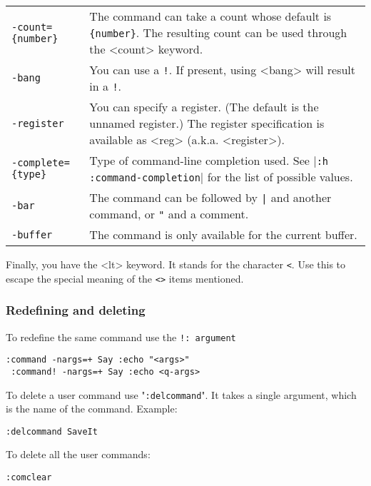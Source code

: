 \begin{center} \begin{tabularx} {\textwidth}{l X} %
				\texttt{-count=\{number\}} & The command can take a count whose default is \texttt{\{number\}}.  The resulting count can be used through the <count> keyword. \\
				\texttt{-bang} & You can use a \texttt{!}.  If present, using <bang> will result in a \texttt{!}. \\
				\texttt{-register} & You can specify a register.  (The default is the unnamed register.) The register specification is available as <reg> (a.k.a. <register>). \\
				\texttt{-complete=\{type\}} & Type of command-line completion used.  See |\texttt{:h :command-completion}| for the list of possible values. \\
				\texttt{-bar} & The command can be followed by \texttt{|} and another command, or \texttt{"} and a comment. \\
				\texttt{-buffer} & The command is only available for the current buffer. \\
\end{tabularx} \end{center}

Finally, you have the <lt> keyword.
It stands for the character \texttt{<}.
Use this to escape the special meaning of the \texttt{<>} items mentioned.

\subsubsection{Redefining and deleting}
To redefine the same command use the \texttt{!: argument}

\begin{Verbatim}[samepage=true]
 :command -nargs=+ Say :echo "<args>"
 :command! -nargs=+ Say :echo <q-args>
\end{Verbatim}

To delete a user command use "\texttt{:delcommand}".
It takes a single argument, which is the name of the command.
Example:

\begin{Verbatim}[samepage=true]
 :delcommand SaveIt
\end{Verbatim}

To delete all the user commands:

\begin{Verbatim}[samepage=true]
 :comclear
\end{Verbatim}

